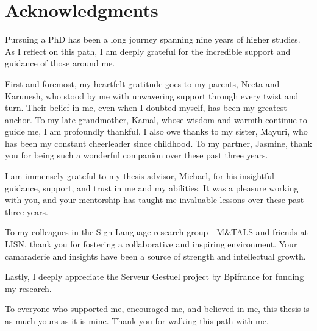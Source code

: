 \documentclass[a4paper,12pt]{report}
\begin{document}
\chapter*{Acknowledgments}

Pursuing a PhD has been a long journey spanning nine years of higher studies. As I reflect on this path, I am deeply grateful for the incredible support and guidance of those around me.

First and foremost, my heartfelt gratitude goes to my parents, Neeta and Karunesh, who stood by me with unwavering support through every twist and turn. Their belief in me, even when I doubted myself, has been my greatest anchor. To my late grandmother, Kamal, whose wisdom and warmth continue to guide me, I am profoundly thankful. I also owe thanks to my sister, Mayuri, who has been my constant cheerleader since childhood. To my partner, Jasmine, thank you for being such a wonderful companion over these past three years.

I am immensely grateful to my thesis advisor, Michael, for his insightful guidance, support, and trust in me and my abilities. It was a pleasure working with you, and your mentorship has taught me invaluable lessons over these past three years.

To my colleagues in the Sign Language research group - M\&TALS and friends at LISN, thank you for fostering a collaborative and inspiring environment. Your camaraderie and insights have been a source of strength and intellectual growth.

Lastly, I deeply appreciate the Serveur Gestuel project by Bpifrance for funding my research.

To everyone who supported me, encouraged me, and believed in me, this thesis is as much yours as it is mine. Thank you for walking this path with me.
\end{document}
